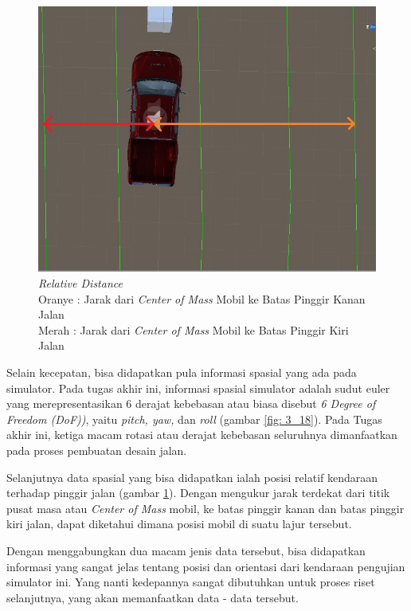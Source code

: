         \begin{figure}  [!htb]
	        \captionsetup{justification=centering}
	        \includegraphics[scale=0.5]{img/relative-dist.jpg}
	        \caption{\textit{Relative Distance} \\ Oranye : Jarak dari \textit{Center of Mass} Mobil ke Batas Pinggir Kanan Jalan \\ Merah : Jarak dari \textit{Center of Mass} Mobil ke Batas Pinggir Kiri Jalan}
	        \label{fig: 3_19}
        \end{figure}
        
        Selain kecepatan, bisa didapatkan pula informasi spasial yang ada pada simulator. Pada tugas akhir ini, informasi spasial simulator adalah sudut euler yang merepresentasikan 6 derajat kebebasan atau biasa disebut \textit{6 Degree of Freedom (DoF))}, yaitu \textit{pitch, yaw,} dan \textit{roll} (gambar \ref{fig: 3_18}). Pada Tugas akhir ini, ketiga macam rotasi atau derajat kebebasan seluruhnya dimanfaatkan pada proses pembuatan desain jalan.
        
        \par Selanjutnya data spasial yang bisa didapatkan ialah posisi relatif kendaraan terhadap pinggir jalan (gambar \ref{fig: 3_19}). Dengan mengukur jarak terdekat dari titik pusat masa atau \textit{Center of Mass} mobil, ke batas pinggir kanan dan batas pinggir kiri jalan, dapat diketahui dimana posisi mobil di suatu lajur tersebut.
        
        \par Dengan menggabungkan dua macam jenis data tersebut, bisa didapatkan informasi yang sangat jelas tentang posisi dan orientasi dari kendaraan pengujian simulator ini. Yang nanti kedepannya sangat dibutuhkan untuk proses riset selanjutnya, yang akan memanfaatkan data - data tersebut.
        
